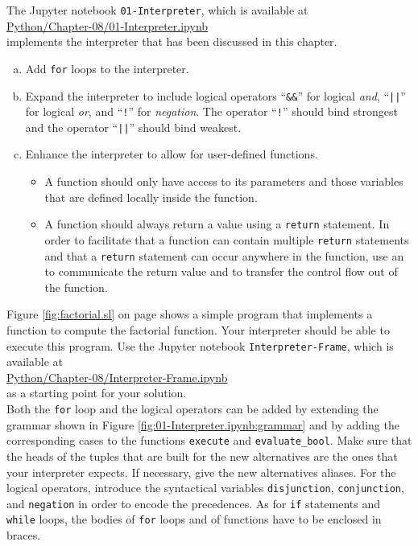 \noindent
The Jupyter notebook \texttt{01-Interpreter}, which is available at
\\[0.2cm]
\hspace*{1.3cm}
\href{https://github.com/karlstroetmann/Formal-Languages/blob/master/Python/Chapter-08/01-Interpreter.ipynb}{Python/Chapter-08/01-Interpreter.ipynb}
\\[0.2cm]
implements the interpreter that has been discussed in this chapter.

\exerciseEng
\begin{enumerate}[(a)]
\item Add \texttt{for} loops to the interpreter.
\item Expand the interpreter to include logical operators
      ``\texttt{\&\&}'' for logical \emph{and}, ``\texttt{||}'' for logical \emph{or},
      and ``\texttt{!}'' for \emph{negation}.  The operator ``\texttt{!}'' should bind 
      strongest and the operator ``\texttt{||}'' should bind weakest.
\item Enhance the interpreter to allow for user-defined functions.
      \begin{itemize}
      \item A function should only have access to its parameters and those variables that
            are defined locally inside the function.  
      \item A function should always return a value using a \texttt{return} statement.
            In order to facilitate that a function can contain multiple \texttt{return}
            statements and that a \texttt{return} statement can occur
            anywhere in the function, use an  to communicate the
            return value and to transfer the control flow out of the function.
      \end{itemize}
\end{enumerate}
Figure \ref{fig:factorial.sl} on page \pageref{fig:factorial.sl} shows a simple program
that implements a function to compute the factorial function.  Your interpreter should be able to execute this
program.
Use the Jupyter notebook \texttt{Interpreter-Frame}, which is available at
\\[0.2cm]
\hspace*{1.3cm}
\href{https://github.com/karlstroetmann/Formal-Languages/blob/master/Python/Chapter-08/Interpreter-Frame.ipynb}{Python/Chapter-08/Interpreter-Frame.ipynb}
\\[0.2cm]
as a starting point for your solution.
\\[0.2cm]
\hint
Both the \texttt{for} loop and the logical operators can be added by extending the grammar shown in Figure
\ref{fig:01-Interpreter.ipynb:grammar} and by adding the corresponding cases to the functions
\texttt{execute} and \texttt{evaluate\_bool}.  Make sure that the heads of the tuples that are built for the
new alternatives are the ones that your interpreter expects.  If necessary, give the new alternatives
aliases.  For the logical operators, introduce the syntactical variables \texttt{disjunction},
\texttt{conjunction}, and \texttt{negation} in order to encode the precedences.  As for \texttt{if} statements and
\texttt{while} loops, the bodies of \texttt{for} loops and of functions have to be enclosed in braces.
\eox

